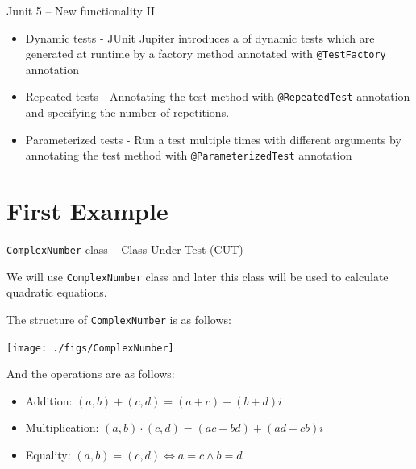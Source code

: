 \documentclass[11pt, xcolor=svgnames]{beamer}
\begin{document}

\begin{frame}{Junit 5 -- New functionality II}

\begin{itemize}
  \item Dynamic tests - JUnit Jupiter introduces a of dynamic tests which are generated at runtime by a factory method annotated with \texttt{@TestFactory} annotation

  \item Repeated tests - Annotating the test method with \texttt{@RepeatedTest} annotation and specifying the number of repetitions.

  \item Parameterized tests - Run a test multiple times with different arguments by annotating the test method with \texttt{@ParameterizedTest} annotation 

\end{itemize}

\end{frame}


\section{First Example}



\begin{frame}[fragile]{\texttt{ComplexNumber} class -- Class Under Test (CUT)}

We will use \texttt{ComplexNumber} class and later this class will be used to calculate quadratic equations.

The structure of \texttt{ComplexNumber} is as follows:

\begin{center}
 \texttt{[image: ./figs/ComplexNumber]}
\end{center}

And the operations are as follows:

\begin{itemize}
 \item Addition: $(a,b)+(c,d)=(a+c)+(b+d)i$
 \item Multiplication: $(a,b)\cdot(c,d)=(ac-bd) + (ad+cb)i$
 \item Equality: $(a,b)=(c,d) \Leftrightarrow a=c \wedge b=d$
\end{itemize}

\end{frame}
\end{document}
